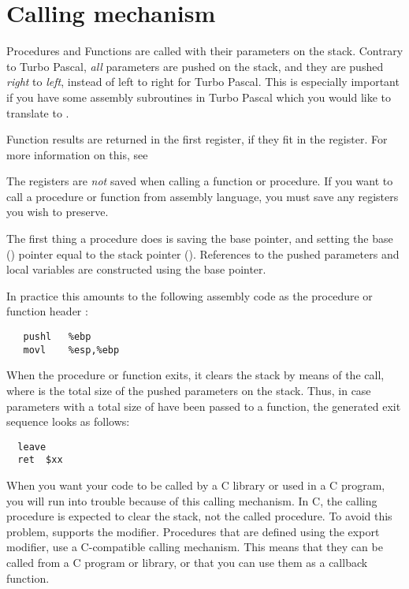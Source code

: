 \documentclass{report}
\begin{document}
\section{Calling mechanism}
\label{se:Calling}
Procedures and Functions are called with their parameters on the stack.
Contrary to Turbo Pascal, {\em all} parameters are pushed on the stack, and
they are pushed {\em right} to {\em left}, instead of left to right for
Turbo Pascal. This is especially important if you have some assembly
subroutines in Turbo Pascal which you would like to translate to \fpc.

Function results are returned in the first register, if they fit in the
register. For more information on this, see 

The registers are {\em not} saved when calling a function or procedure. If
you want to call a procedure or function from assembly language, you must
save any registers you wish to preserve.

The first thing a procedure does is saving the base pointer, and setting the
base () pointer equal to the stack pointer (). 
References to the pushed parameters and local variables are constructed 
using the base pointer.

In practice this amounts to the following assembly code as the procedure or
function header :
\begin{verbatim}
   pushl   %ebp
   movl    %esp,%ebp
\end{verbatim}  

When the procedure or function exits, it clears the stack by means of the
 call, where  is the total size of the pushed parameters
on the stack. Thus, in case parameters with a total size of  have
been passed to a function, the generated exit sequence looks as follows:
\begin{verbatim}
  leave
  ret  $xx
\end{verbatim}

When you want your code to be called by a C library or used in a C
program, you will run into trouble because of this calling mechanism. In C,
the calling procedure is expected to clear the stack, not the called
procedure. To avoid this problem, \fpc supports the  modifier.
Procedures that are defined using the export modifier, use a C-compatible
calling mechanism. This means that they can be called from a C program or
library, or that you can use them as a callback function.
\end{document}
